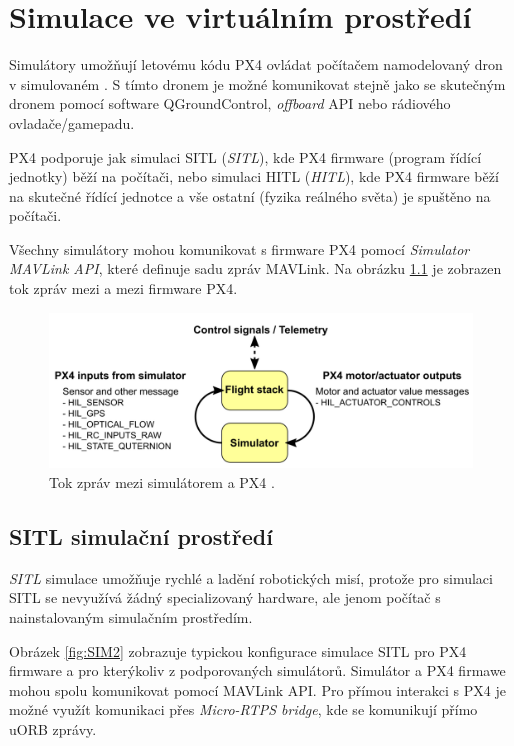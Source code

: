 \chapter{Simulace ve virtuálním prostředí}

Simulátory umožňují letovému kódu PX4 ovládat počítačem namodelovaný dron v simulovaném . S tímto dronem je možné komunikovat stejně jako se skutečným dronem pomocí software QGroundControl, \textit{offboard} API nebo rádiového ovladače/gamepadu. 

PX4 podporuje jak simulaci \acs{SITL} (\textit{\acl{SITL}}), kde PX4 firmware (program řídící jednotky) běží na počítači, nebo simulaci \acs{HITL} (\textit{\acl{HITL}}), kde PX4 firmware běží na skutečné řídící jednotce a vše ostatní (fyzika reálného světa) je spuštěno na počítači. \cite{PX4docs}

Všechny simulátory mohou komunikovat s firmware PX4 pomocí \textit{Simulator MAVLink API}, které definuje sadu zpráv MAVLink. Na obrázku \ref{fig:SIM1} je zobrazen tok zpráv mezi  a mezi firmware PX4.

\begin{figure}[!ht]
  \begin{center}
    \includegraphics[scale=0.3]{obrazky/SIM1}
  \end{center}
  \caption[Tok zpráv mezi simulátorem a PX4]{Tok zpráv mezi simulátorem a PX4 \cite{PX4docs}.}
  \label{fig:SIM1}
\end{figure}

\section{SITL simulační prostředí}

\textit{\acl{SITL}} simulace umožňuje rychlé a  ladění robotických misí, protože pro simulaci \acs{SITL} se nevyužívá žádný specializovaný hardware, ale jenom počítač s nainstalovaným simulačním prostředím.

Obrázek \ref{fig:SIM2} zobrazuje typickou konfigurace simulace \acs{SITL} pro PX4 firmware a pro kterýkoliv z podporovaných simulátorů. Simulátor a PX4 firmawe mohou spolu komunikovat pomocí MAVLink \acs{API}. Pro přímou interakci s PX4 je možné využít komunikaci přes \textit{Micro-RTPS bridge}, kde se komunikují přímo uORB zprávy.

